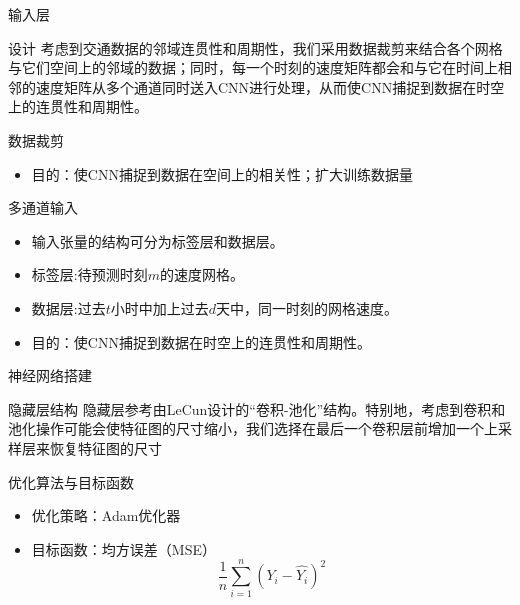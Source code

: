 \documentclass[10pt]{beamer}
\begin{document}
\begin{frame}{输入层}
    \begin{block}{设计}
       考虑到交通数据的邻域连贯性和周期性，我们采用\alert{数据裁剪}来结合各个网格与它们空间上的邻域的数据；同时，每一个时刻的速度矩阵都会和与它在时间上相邻的速度矩阵从\alert{多个通道}同时送入CNN进行处理，从而使CNN捕捉到数据在时空上的连贯性和周期性。
    \end{block}
    
    \begin{block}{数据裁剪}
        \begin{itemize}
            \item 目的：使CNN捕捉到数据在\alert{空间上的相关性}；扩大训练数据量
        \end{itemize}
    \end{block}
    
    \begin{block}{多通道输入}
    \begin{itemize}
        \item 输入张量的结构可分为\alert{标签层}和\alert{数据层}。
        \item 标签层:待预测时刻$m$的速度网格。
        \item 数据层:过去$t$小时中加上过去$d$天中，同一时刻的网格速度。
        \item 目的：使CNN捕捉到数据在时空上的\alert{连贯性}和\alert{周期性}。
    \end{itemize}
    \end{block}
\end{frame}



\begin{frame}{神经网络搭建}
    \begin{block}{隐藏层结构}
    隐藏层参考由LeCun设计的\alert{“卷积-池化”结构}。特别地，考虑到卷积和池化操作可能会使特征图的尺寸缩小，我们选择在最后一个卷积层前增加一个\alert{上采样层}来恢复特征图的尺寸
    \end{block}
    
    \begin{block}{优化算法与目标函数}
        \begin{itemize}
            \item 优化策略：Adam优化器
            \item 目标函数：均方误差（MSE）\\
            \begin{equation}
                \frac{1}{n} \sum_{i=1}^{n} \left( Y_i - \hat{Y_i} \right)^2
            \end{equation}
            \end{itemize}
    \end{block} 
\end{frame}
\end{document}
